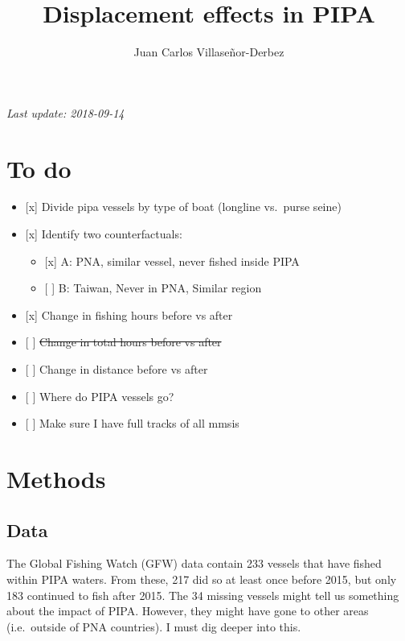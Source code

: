 \documentclass[]{article}
\title{Displacement effects in PIPA}
\author{Juan Carlos Villaseñor-Derbez}
\date{}
\providecommand{\tightlist}{%
  \setlength{\itemsep}{0pt}\setlength{\parskip}{0pt}}
\theoremstyle{definition}
\theoremstyle{definition}
\theoremstyle{definition}
\theoremstyle{remark}
\begin{document}
\maketitle

{
\setcounter{tocdepth}{4}
\tableofcontents
}
\emph{Last update: 2018-09-14}

\section{To do}\label{to-do}

\begin{itemize}
\tightlist
\item
  {[}x{]} Divide pipa vessels by type of boat (longline vs.~purse seine)
\item
  {[}x{]} Identify two counterfactuals:

  \begin{itemize}
  \tightlist
  \item
    {[}x{]} A: PNA, similar vessel, never fished inside PIPA
  \item
    {[} {]} B: Taiwan, Never in PNA, Similar region
  \end{itemize}
\item
  {[}x{]} Change in fishing hours before vs after
\item
  {[} {]} \sout{Change in total hours before vs after}
\item
  {[} {]} Change in distance before vs after
\item
  {[} {]} Where do PIPA vessels go?
\item
  {[} {]} Make sure I have full tracks of all mmsis
\end{itemize}

\clearpage

\section{Methods}\label{methods}

\subsection{Data}\label{data}

The Global Fishing Watch (GFW) data contain 233 vessels that have fished
within PIPA waters. From these, 217 did so at least once before 2015,
but only 183 continued to fish after 2015. The 34 missing vessels might
tell us something about the impact of PIPA. However, they might have
gone to other areas (i.e.~outside of PNA countries). I must dig deeper
into this.
\end{document}

